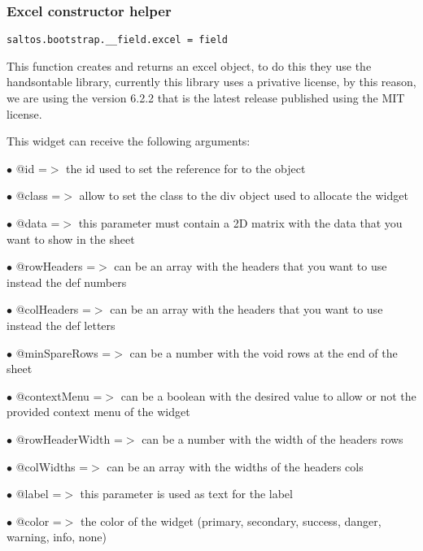 \documentclass[a4paper]{article}
\begin{document}
\hypertarget{toc631}{}
\subsubsection{Excel constructor helper}

\begin{lstlisting}
saltos.bootstrap.__field.excel = field
\end{lstlisting}

This function creates and returns an excel object, to do this they use the handsontable library,
currently this library uses a privative license, by this reason, we are using the version 6.2.2
that is the latest release published using the MIT license.

This widget can receive the following arguments:

\begin{compactitem}
\item[\color{myblue}$\bullet$] @id             =$>$ the id used to set the reference for to the object
\item[\color{myblue}$\bullet$] @class          =$>$ allow to set the class to the div object used to allocate the widget
\item[\color{myblue}$\bullet$] @data           =$>$ this parameter must contain a 2D matrix with the data that you want to show
                   in the sheet
\item[\color{myblue}$\bullet$] @rowHeaders     =$>$ can be an array with the headers that you want to use instead the def numbers
\item[\color{myblue}$\bullet$] @colHeaders     =$>$ can be an array with the headers that you want to use instead the def letters
\item[\color{myblue}$\bullet$] @minSpareRows   =$>$ can be a number with the void rows at the end of the sheet
\item[\color{myblue}$\bullet$] @contextMenu    =$>$ can be a boolean with the desired value to allow or not the provided
                   context menu of the widget
\item[\color{myblue}$\bullet$] @rowHeaderWidth =$>$ can be a number with the width of the headers rows
\item[\color{myblue}$\bullet$] @colWidths      =$>$ can be an array with the widths of the headers cols
\item[\color{myblue}$\bullet$] @label          =$>$ this parameter is used as text for the label
\item[\color{myblue}$\bullet$] @color          =$>$ the color of the widget (primary, secondary, success, danger, warning, info, none)
\end{compactitem}
\end{document}
